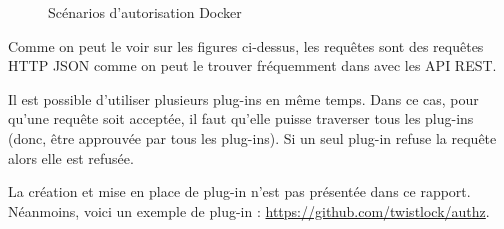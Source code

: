 \documentclass[11pt,a4paper,oneside]{report}
\begin{document}
\begin{figure}[H]
    \hfill

    \caption[]{Scénarios d'autorisation Docker\protect{\footnotemark}}
\end{figure}


Comme on peut le voir sur les figures ci-dessus, les requêtes sont des requêtes HTTP JSON comme on peut le trouver fréquemment dans avec les API REST.

Il est possible d'utiliser plusieurs plug-ins en même temps. Dans ce cas, pour qu'une requête soit acceptée, il faut qu'elle puisse traverser tous les plug-ins (donc, être approuvée par tous les plug-ins). Si un seul plug-in refuse la requête alors elle est refusée.

La création et mise en place de plug-in n'est pas présentée dans ce rapport. Néanmoins, voici un exemple de plug-in : \url{https://github.com/twistlock/authz}.
\end{document}

